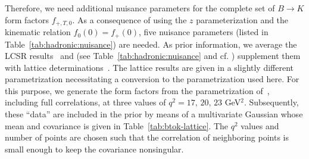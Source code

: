 \documentclass[twocolumn,epjc3]{svjour3}
\numberwithin{equation}{section}
\def \reftab#1{Table~\ref{#1}}
\renewcommand{\[}{\big[}
\renewcommand{\]}{\big]}
\renewcommand{\(}{\big(}
\renewcommand{\)}{\big)}
\begin{document}
{Therefore, we need} additional nuisance parameters for the
complete set of $B\to K$ form factors $f_{+,T,0}$. As a consequence of using the
$z$ parameterization \cite{Khodjamirian:2010vf} and the kinematic relation
$f_0(0) = f_+(0)$, five nuisance parameters (listed in
\reftab{tab:hadronic:nuisance}) are needed. As prior information, we average the
LCSR results~\cite{Khodjamirian:2010vf} and \cite{Ball:2004ye} (see
\reftab{tab:hadronic:nuisance} and cf. \cite{Beaujean:2013soa}) supplement them
with lattice determinations~\cite{Bouchard:2013eph}.
The lattice results are given in a slightly different parametrization
necessitating a conversion to the parametrization used here. For this purpose,
we generate the form factors from the parametrization
of~\cite{Bouchard:2013eph}, including full correlations, at three values of $q^2
= 17,\, 20,\, 23$ GeV$^2$.  Subsequently, these ``data'' are included in the
prior by means of a multivariate Gaussian whose mean and covariance is given in
\reftab{tab:btok-lattice}. The $q^2$ values and number of points are chosen such
that the correlation of neighboring points is small enough to keep the
covariance nonsingular.
\end{document}
